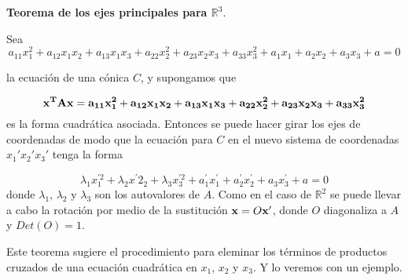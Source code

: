  \bigskip
 \begin{corollary}
     
 \textbf{Teorema de los ejes principales para $\mathbb{R}^3$}.
 
 Sea 
 \begin{equation*}
a_{11}x_1^{2}+a_{12}x_1x_2+a_{13}x_1x_3+a_{22}x_2^{2}+ 

a_{23}x_2x_3+a_{33}x_3^{2}+ a_1 x_1 + a_2 x_2+ a_3 x_3  + a = 0\label{fcuadratica3}
\end{equation*}


la ecuación de una cónica $C$, y supongamos que 
 
 $$\bf{x} ^T A \bf{x}=a_{11}x_1^{2}+a_{12}x_1x_2+a_{13}x_1x_3+a_{22}x_2^{2}+a_{23}x_2x_3+a_{33}x_3^{2}$$
 es la forma cuadrática asociada. Entonces se puede hacer girar los ejes de coordenadas de modo que la ecuación para $C$ en el nuevo sistema de coordenadas $x_1'x_2'x_3'$ tenga la forma  
 
 $$\lambda_1x^{\prime 2}_1+\lambda_2x^{\prime} 2_2+\lambda_3x^{\prime 2}_3  +a_1^{\prime}x_1^{\prime}+ a_2^{\prime}x_2^{\prime}+a_3 x_3^{\prime} +a  =0$$
 donde $\lambda_1$,   $\lambda_2$ y $\lambda_3$ son los autovalores de $A$. Como en el caso de $\mathbb{R}^2$ se puede llevar a cabo la rotación por medio de la sustitución $\bold x=O \bold x'$, donde $O$ diagonaliza a $A$ y $Det(O)=1$.
 \end{corollary}
 
 Este teorema sugiere el procedimiento para eleminar los términos de productos cruzados de una ecuación cuadrática en  $x_1$, $x_2$ y $x_3$. Y lo veremos con un ejemplo.
 
